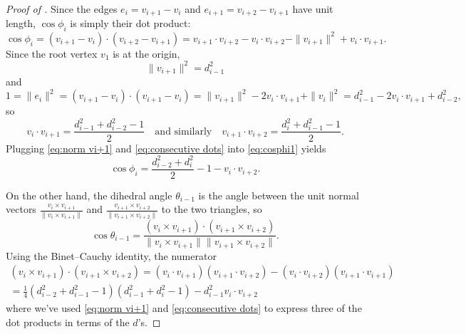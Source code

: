 \documentclass[10pt,a4paper]{amsart}
\begin{document}
	\begin{proof}[{Proof of }]
	Since the edges $e_i = v_{i+1}-v_i$ and $e_{i+1} = v_{i+2}-v_{i+1}$ have unit length, $\cos \phi_i$ is simply their dot product:
	\begin{equation}\label{eq:cosphi1}
		\cos\phi_i = (v_{i+1}-v_i) \cdot (v_{i+2}-v_{i+1}) = v_{i+1} \cdot v_{i+2} - v_i \cdot v_{i+2} - \|v_{i+1}\|^2 + v_i \cdot v_{i+1}.
	\end{equation}
	Since the root vertex $v_1$ is at the origin, 
	\begin{equation}\label{eq:norm vi+1}
		\|v_{i+1}\|^2 = d_{i-1}^2
	\end{equation} 
	and 
	\[
		1 = \|e_i\|^2 = (v_{i+1} - v_i) \cdot (v_{i+1} - v_i) = \|v_{i+1}\|^2 - 2 v_i \cdot v_{i+1} + \|v_i\|^2 = d_{i-1}^2 - 2 v_i \cdot v_{i+1} + d_{i-2}^2,
	\]
	so 
	\begin{equation}\label{eq:consecutive dots}
		v_i \cdot v_{i+1} = \frac{d_{i-1}^2 + d_{i-2}^2 - 1}{2} \quad \text{and similarly} \quad v_{i+1} \cdot v_{i+2} = \frac{d_{i}^2 + d_{i-1}^2 - 1}{2}.
	\end{equation}
	Plugging \eqref{eq:norm vi+1} and \eqref{eq:consecutive dots} into \eqref{eq:cosphi1} yields
	\begin{equation}\label{eq:cosphi}
		\cos \phi_i = \frac{d_{i-2}^2 + d_i^2}{2} - 1 - v_i \cdot v_{i+2}.
	\end{equation}
	
	On the other hand, the dihedral angle $\theta_{i-1}$ is the angle between the unit normal vectors $\frac{v_i \times v_{i+1}}{\|v_i \times v_{i+1}\|}$ and $\frac{v_{i+1} \times v_{i+2}}{\|v_{i+1} \times v_{i+2}\|}$ to the two triangles, so
	\begin{equation}\label{eq:costheta1}
		\cos\theta_{i-1} = \frac{(v_i \times v_{i+1})\cdot(v_{i+1} \times v_{i+2})}{\|v_i \times v_{i+1}\|\|v_{i+1} \times v_{i+2}\|}.
	\end{equation}
	Using the Binet–Cauchy identity, the numerator 
	\begin{multline}\label{eq:quadruple product}
		(v_i \times v_{i+1})\cdot(v_{i+1} \times v_{i+2}) = (v_i \cdot v_{i+1})(v_{i+1} \cdot v_{i+2}) - (v_i \cdot v_{i+2})(v_{i+1} \cdot v_{i+1}) \\
		= \frac{1}{4}(d_{i-2}^2 + d_{i-1}^2 - 1)(d_{i-1}^2 + d_{i}^2 - 1) - d_{i-1}^2 v_i \cdot v_{i+2}
	\end{multline}
	where we've used \eqref{eq:norm vi+1} and \eqref{eq:consecutive dots} to express three of the dot products in terms of the $d$'s.
	

\end{proof}
\end{document}
